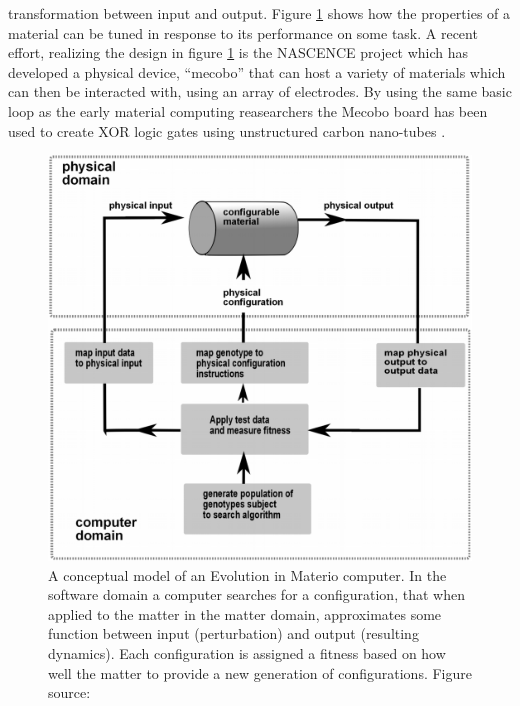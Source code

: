 transformation between input and output.
Figure \ref{figEiM} shows how the properties of a material can be tuned in
response to its performance on some task.
A recent effort, realizing the design in figure \ref{figEiM} is the NASCENCE project
which has developed a physical device, ``mecobo'' that can host a variety of
materials which can then be interacted with, using an array of electrodes.
%
By using the same basic loop as the early material computing reasearchers the
Mecobo board has been used to create XOR logic gates using unstructured carbon
nano-tubes \cite{LYKKEBOICES2014}.
%
\begin{figure}[h]
  \centering
  \includegraphics[width=1\textwidth]{fig/GunnarEiM.png}
  \caption[A conceptual Evolution in materio computer]{
    A conceptual model of an Evolution in Materio computer.
    In the software domain a computer searches for a configuration, that when
    applied to the matter in the matter domain, approximates some function
    between input (perturbation) and output (resulting dynamics).
    Each configuration is assigned a fitness based on how well the matter
    to provide a new generation of configurations.
    Figure source: \cite{MILLER_EI2014}
  }
  \label{figEiM}
\end{figure}
